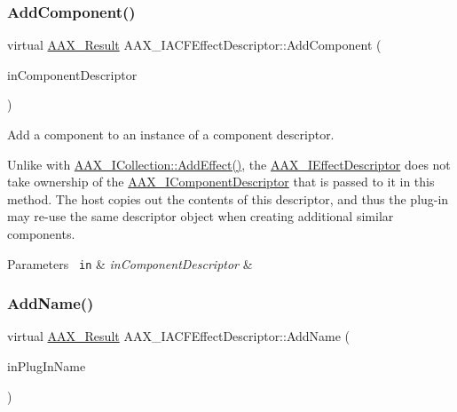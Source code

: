 \subsubsection{\texorpdfstring{AddComponent()}{AddComponent()}}
{\footnotesize\ttfamily virtual \mbox{\hyperlink{a00392_a4d8f69a697df7f70c3a8e9b8ee130d2f}{A\+A\+X\+\_\+\+Result}} A\+A\+X\+\_\+\+I\+A\+C\+F\+Effect\+Descriptor\+::\+Add\+Component (\begin{DoxyParamCaption}\item[{\mbox{\hyperlink{a01409}{I\+A\+C\+F\+Unknown}} $\ast$}]{in\+Component\+Descriptor }\end{DoxyParamCaption})\hspace{0.3cm}{\ttfamily [pure virtual]}}



Add a component to an instance of a component descriptor. 

Unlike with \mbox{\hyperlink{a01777_a5ff114b8c4da2081515186f2faf65c8c}{A\+A\+X\+\_\+\+I\+Collection\+::\+Add\+Effect()}}, the \mbox{\hyperlink{a01813}{A\+A\+X\+\_\+\+I\+Effect\+Descriptor}} does not take ownership of the \mbox{\hyperlink{a01781}{A\+A\+X\+\_\+\+I\+Component\+Descriptor}} that is passed to it in this method. The host copies out the contents of this descriptor, and thus the plug-\/in may re-\/use the same descriptor object when creating additional similar components.


\begin{DoxyParams}[1]{Parameters}
\mbox{\texttt{ in}}  & {\em in\+Component\+Descriptor} & \\
\hline
\end{DoxyParams}
\mbox{\label{a01653_a931fdad618c2e12c1e921dca5b3c6f56}} 
\subsubsection{\texorpdfstring{AddName()}{AddName()}}
{\footnotesize\ttfamily virtual \mbox{\hyperlink{a00392_a4d8f69a697df7f70c3a8e9b8ee130d2f}{A\+A\+X\+\_\+\+Result}} A\+A\+X\+\_\+\+I\+A\+C\+F\+Effect\+Descriptor\+::\+Add\+Name (\begin{DoxyParamCaption}\item[{const char $\ast$}]{in\+Plug\+In\+Name }\end{DoxyParamCaption})\hspace{0.3cm}{\ttfamily [pure virtual]}}



